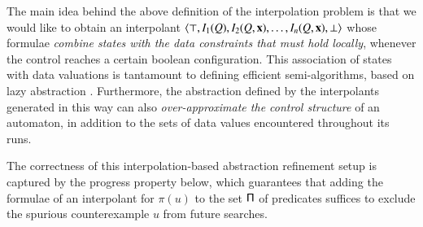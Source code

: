 \documentclass[10pt,conference,letterpaper,twocolumn]{IEEEtran}
\begin{document}
The main idea behind the above definition of the interpolation problem
is that we would like to obtain an interpolant $\left\langle \top,I_1(Q),
  I_2(Q,\mathbf x), \ldots, I_{n}(Q,\mathbf x),\bot \right\rangle$ whose formulae
\emph{combine states with the data constraints that must hold
  locally}, whenever the control reaches a certain boolean
configuration. This association of states with data valuations is
tantamount to defining efficient semi-algorithms, based on lazy
abstraction \cite{HJMS02}. Furthermore, the abstraction defined by the
interpolants generated in this way can also \emph{over-approximate the
  control structure} of an automaton, in addition to the sets of data
values encountered throughout its runs.

The correctness of this interpolation-based abstraction refinement
setup is captured by the progress property below, which guarantees
that adding the formulae of an interpolant for $\pi(u)$ to the set
$\mathsf{\Pi}$ of predicates suffices to exclude the spurious counterexample
$u$ from future searches.
\end{document}
